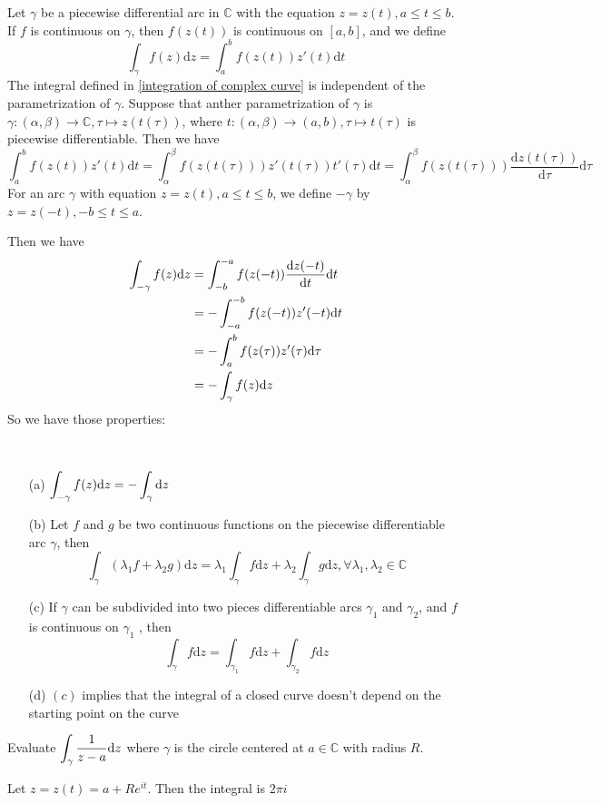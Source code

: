 Let  $ \gamma $ be a piecewise differential arc in  $ \mathbb{C} $ with the equation  $ z=z(t),a \leq t \leq b $. If  $ f  $ is continuous on  $ \gamma $, then  $ f(z(t)) $ is continuous on  $ [a,b] $, and we define
\begin{equation}
    \int_\gamma f(z)\mathrm{d}z=\int_a^bf(z(t))z'(t)\mathrm{d}t\label{integration of complex curve}
\end{equation}  
The integral defined in \ref{integration of complex curve} is independent of the parametrization of  $ \gamma $. Suppose that anther parametrization of  $ \gamma $ is  $ \gamma:(\alpha,\beta)\rightarrow \mathbb{C} ,\tau\mapsto z(t(\tau))$, where  $ t:(\alpha,\beta)\rightarrow (a,b),\tau\mapsto t(\tau) $ is piecewise differentiable. Then we have
\begin{equation}
    \int_a^b f(z(t))z'(t)\mathrm{d}t=\int_\alpha^\beta f(z(t(\tau)))z'(t(\tau))t'(\tau)\mathrm{d}t=\int_\alpha^\beta f(z(t(\tau)))\frac{\mathrm{d}z(t(\tau))}{\mathrm{d}\tau}\mathrm{d}\tau
\end{equation}
\newline
For an arc  $ \gamma $ with equation  $ z=z(t),a \leq t \leq b $, we define  $ -\gamma $ by  $ z=z(-t),-b \leq t \leq a $.

Then we have 
\begin{align*}
    \int_{-\gamma}f(z)\mathrm{d}z&=\int_{-b}^{-a}f(z(-t))\displaystyle\frac{\mathrm{d}z(-t)}{\mathrm{d}t}\mathrm{d}t\\
    &=-\int_{-a}^{-b}f(z(-t))z'(-t)\mathrm{d}t\\
    &=-\int_{a}^bf(z(\tau))z'(\tau)\mathrm{d}\tau\\
    &=-\int_\gamma f(z)\mathrm{d}z
\end{align*}
So we have those properties:
\begin{proposition}
    \,
    \begin{enumerate}
        \item[(a)]  $ \displaystyle\int_{-\gamma}f(z)\mathrm{d}z=-\int_\gamma\mathrm{d}z $
        \item[(b)] Let  $ f $ and  $ g $ be two continuous functions on the piecewise differentiable arc  $ \gamma $, then 
        \[\int_\gamma(\lambda_1f+\lambda_2g)\mathrm{d}z=\lambda_1\int_\gamma f\mathrm{d}z+\lambda_2\int_\gamma g\mathrm{d}z,\forall \lambda_1,\lambda_2\in\mathbb{C}\]      
        \item[(c)] If  $ \gamma $ can be subdivided into two pieces differentiable arcs  $ \gamma_1 $ and  $ \gamma_2 $, and  $ f $ is continuous on  $ \gamma_1 $ , then
        \[\int_\gamma f\mathrm{d}z=\int_{\gamma_1} f\mathrm{d}z+\int_{\gamma_2} f\mathrm{d}z\]
        \item[(d)]  $ (c) $ implies that the integral of a closed curve doesn't depend on the starting point on the curve 
    \end{enumerate}
\end{proposition}
\begin{example}
    Evaluate  $ \displaystyle\int_\gamma\frac{1}{z-a}\mathrm{d}z $ where  $ \gamma $ is the circle centered at  $ a\in\mathbb{C} $ with radius  $ R $. 
    
    Let  $ z=z(t)=a+Re^{it} $. Then the integral is  $ 2\pi i $  
\end{example}
